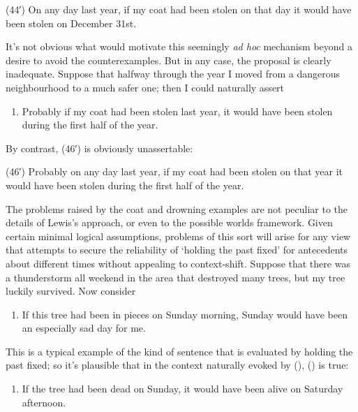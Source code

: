(44′) On any day last year, if my coat had been stolen on that day it
would have been stolen on December 31st.

It's not obvious what would motivate this seemingly \emph{ad hoc}
mechanism beyond a desire to avoid the counterexamples. But in any case,
the proposal is clearly inadequate. Suppose that halfway through the
year I moved from a dangerous neighbourhood to a much safer one; then I
could naturally assert

\begin{enumerate}
\def\labelenumi{(\arabic{enumi})}
\setcounter{enumi}{41}
\itemsep1pt\parskip0pt
\item
  Probably if my coat had been stolen last year, it would have been
  stolen during the first half of the year.
\end{enumerate}

By contrast, (46′) is obviously unassertable:

(46′) Probably on any day last year, if my coat had been stolen on that
year it would have been stolen during the first half of the year.

The problems raised by the coat and drowning examples are not peculiar
to the details of Lewis's approach, or even to the possible worlds
framework. Given certain minimal logical assumptions, problems of this
sort will arise for any view that attempts to secure the reliability of
`holding the past fixed' for antecedents about different times without
appealing to context-shift. Suppose that there was a thunderstorm all
weekend in the area that destroyed many trees, but my tree luckily
survived. Now consider

\begin{enumerate}
\def\labelenumi{(\arabic{enumi})}
\setcounter{enumi}{42}
\itemsep1pt\parskip0pt
\item
  If this tree had been in pieces on Sunday morning, Sunday would have
  been an especially sad day for me.
\end{enumerate}

This is a typical example of the kind of sentence that is evaluated by
holding the past fixed; so it's plausible that in the context naturally
evoked by (), () is true:

\begin{enumerate}
\def\labelenumi{(\arabic{enumi})}
\setcounter{enumi}{43}
\itemsep1pt\parskip0pt
\item
  If the tree had been dead on Sunday, it would have been alive on
  Saturday afternoon.
\end{enumerate}

